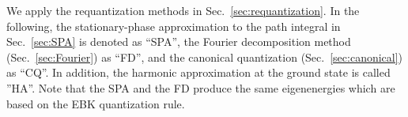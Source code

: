\documentclass[%
superscriptaddress,
preprint,
showpacs,
nofootinbib,
amsmath,amssymb,
prc,
floatfix ]%
{revtex4-1}
\begin{document}



We apply the requantization methods in Sec.~\ref{sec:requantization}.
In the following, the stationary-phase approximation to the path
integral in Sec.~\ref{sec:SPA} is denoted as ``SPA'',
the Fourier decomposition method (Sec.~\ref{sec:Fourier}) as ``FD'',
and the canonical quantization (Sec.~\ref{sec:canonical}) as ``CQ''.
In addition, the harmonic approximation at the ground state is
called ''HA''.
Note that the SPA and the FD produce the same eigenenergies which
are based on the EBK quantization rule.
\end{document}
